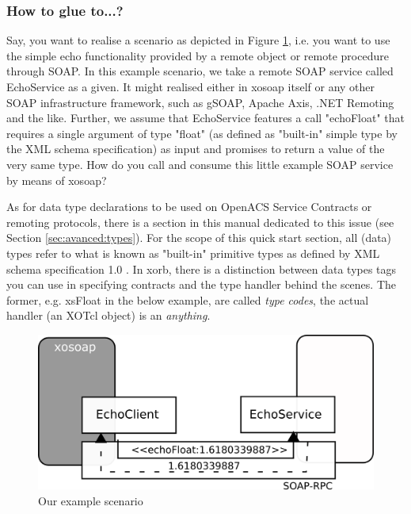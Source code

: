   \subsubsection{How to glue to...?}\label{sec:xosoap:quickstart:glueto} 
  Say, you want to realise a scenario as depicted in Figure
\ref{fig:quickstart:xosoap:1}, i.e. you want to use the simple echo
functionality provided by a remote object or remote procedure through
SOAP. In this example scenario, we take a remote SOAP service called
EchoService as a given. It might realised either in xosoap itself or
any other SOAP infrastructure framework, such as gSOAP, Apache Axis,
.NET Remoting and the like. Further, we assume that EchoService
features a call "echoFloat" that requires a single argument of type
"float" (as defined as "built-in" simple type by the XML schema
specification) as input and promises to return a value of the very
same type. How do you call and consume this little example SOAP
service by means of xosoap?
\begin{hints}
\item As for data type declarations to be used on OpenACS Service
  Contracts or remoting protocols, there is a section in this manual
  dedicated to this issue (see Section \ref{sec:avanced:types}). For the
  scope of this quick start section, all (data) types refer to what is
  known as "built-in" primitive types as defined by XML schema
  specification 1.0 \cite{w3c:2004}. In xorb, there is a distinction
  between data types tags you can use in specifying contracts and the
  type handler behind the scenes. The former, e.g. xsFloat in the below
  example, are called \emph{type codes}, the actual handler (an XOTcl
  object) is an \emph{anything}.
\end{hints}
\begin{figure}[htbp]
  \begin{center}
    \includegraphics[scale=0.5]{img/consumer.png}
    \caption{Our example scenario}
    \label{fig:quickstart:xosoap:1}
  \end{center}
\end{figure}
